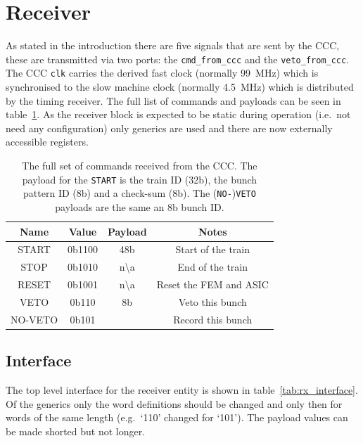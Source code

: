 \section{Receiver} %
\label{sec:receiver}
As stated in the introduction there are five signals that are sent by the CCC, these are transmitted via two ports: the \texttt{cmd\_from\_ccc} and the \texttt{veto\_from\_ccc}. The CCC \texttt{clk} carries the derived fast clock (normally 99~MHz) which is synchronised to the slow machine clock (normally 4.5~MHz) which is distributed by the timing receiver. The full list of commands and payloads can be seen in table~\ref{tab:ccc_commands}. As the receiver block is expected to be static during operation (i.e.\ not need any configuration) only generics are used and there are now externally accessible registers.
\begin{table}[htbp]
  \begin{center}
  \begin{tabular}{c | c | c | c}
    Name     & Value & Payload & Notes \\
    \hline
    START    & 0b1100 & 48b                 & Start of the train \\
    STOP     & 0b1010 & n\textbackslash a   & End of the train \\
    RESET    & 0b1001 & n\textbackslash a   & Reset the FEM and ASIC \\
    \hline
    VETO     & 0b110  & 8b                  & Veto this bunch \\
    NO-VETO  & 0b101  &                     & Record this bunch \\
  \end{tabular}
  \end{center}
  \caption{The full set of commands received from the CCC. The payload for the \texttt{START} is the train ID (32b), the bunch pattern ID (8b) and a check-sum (8b). The (\texttt{NO-})\texttt{VETO} payloads are the same an 8b bunch ID.}
  \label{tab:ccc_commands}
\end{table}

\subsection{Interface} %
\label{sub:rx_interface}
The top level interface for the receiver entity is shown in table~\ref{tab:rx_interface}. Of the generics only the word definitions should be changed and only then for words of the same length (e.g.\ `110' changed for `101'). The payload values can be made shorted but not longer.
    
